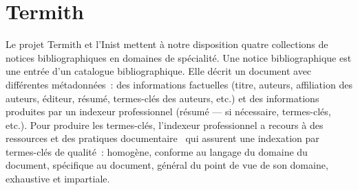   \section{Termith}
  \label{sec:main-data_description-termith_data}
    Le projet Termith et l'Inist mettent à notre disposition quatre collections
    de notices bibliographiques en domaines de spécialité. Une notice
    bibliographique est une entrée d'un catalogue bibliographique. Elle décrit
    un document avec différentes métadonnées~: des informations factuelles
    (titre, auteurs, affiliation des auteurs, éditeur, résumé, termes-clés des
    auteurs, etc.) et des informations produites par un indexeur professionnel
    (résumé --- si nécessaire, termes-clés, etc.). Pour produire les
    termes-clés, l'indexeur professionnel a recours à des ressources et des
    pratiques documentaire~\cite{guinchat1996techniquesdocumentaires} qui
    assurent une indexation par termes-clés de qualité~: homogène, conforme au
    langage du domaine du document, spécifique au document, général du point de
    vue de son domaine, exhaustive et impartiale.
    
